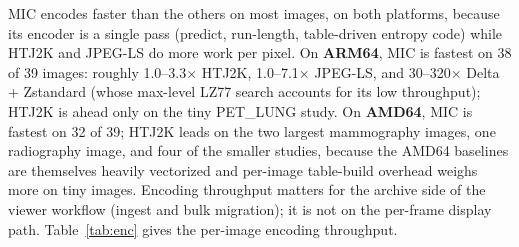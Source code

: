 \documentclass[journal]{IEEEtran}
\begin{document}
MIC encodes faster than the others on most images, on both platforms,
because its encoder is a single pass (predict, run-length, table-driven
entropy code) while HTJ2K and JPEG-LS do more work per pixel. On
\textbf{ARM64}, MIC is fastest on 38 of 39 images: roughly 1.0--3.3$\times$
HTJ2K, 1.0--7.1$\times$ JPEG-LS, and 30--320$\times$ Delta + Zstandard (whose
max-level LZ77 search accounts for its low throughput); HTJ2K is ahead only
on the tiny PET\_LUNG study. On \textbf{AMD64}, MIC is fastest on 32 of 39;
HTJ2K leads on the two largest mammography images, one radiography image,
and four of the smaller studies, because the AMD64 baselines are themselves
heavily vectorized and per-image table-build overhead weighs more on tiny
images. Encoding throughput matters for the archive side of the viewer
workflow (ingest and bulk migration); it is not on the per-frame display
path. Table~\ref{tab:enc} gives the per-image encoding throughput.
\end{document}
